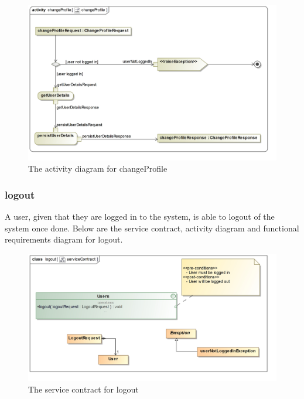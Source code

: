 \begin{figure}[H]
	\centering
	\includegraphics[scale=0.22]{../images/funcReq/changeProfileActivityDiagram.jpg}
	\caption{The activity diagram for changeProfile \label{overflow}}
\end{figure}

\subsubsection{logout}

A user, given that they are logged in to the system, is able to logout of the system once done. Below are the service contract, activity diagram and functional requirements diagram for logout.

\begin{figure}[H]
	\centering
	\includegraphics[width=1.2\textwidth]{../images/funcReq/logoutServiceContract.jpg}
	\caption{The service contract for logout \label{overflow}}
\end{figure}

